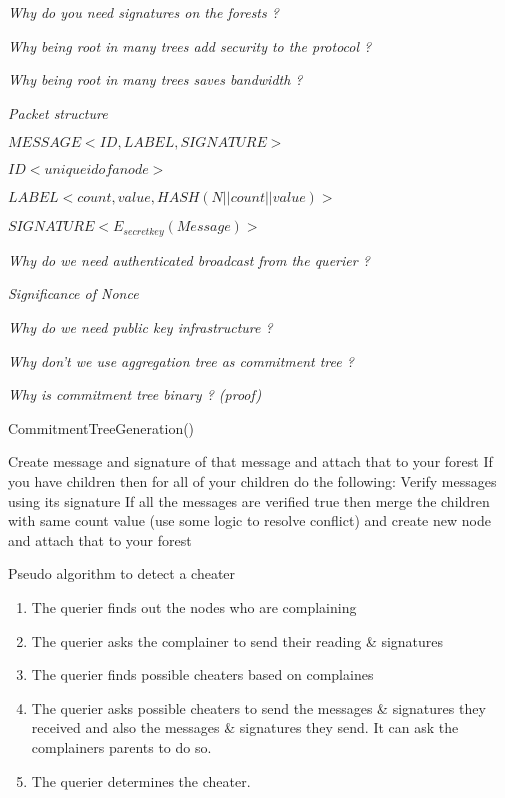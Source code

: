 \textit{Why do you need signatures on the forests ?}

\textit{Why being root in many trees add security to the protocol ?}

\textit{Why being root in many trees saves bandwidth ?}

\textit{Packet structure}

	$MESSAGE <ID, LABEL, SIGNATURE>$

	$ID <unique id of a node>$

	$LABEL <count, value, HASH(N||count||value)>$

	$SIGNATURE <E_{secretkey}(Message)>$

\textit{Why do we need authenticated broadcast from the querier ?}

\textit{Significance of Nonce}

\textit{Why do we need public key infrastructure ?}

\textit{Why don't we use aggregation tree as commitment tree ?}

\textit{Why is commitment tree binary ? (proof)}

\begin{algorithm}[H]
\caption {CommitmentTreeGeneration()}\label{number3}
	\begin {algorithmic}[1]
			\STATE Create message and signature of that message and attach that to your forest
			\STATE If you have children then for all of your children do the following:
			\STATE Verify messages using its signature 
			\STATE If all the messages are verified true then merge the children with same count value (use some logic to resolve conflict) and create new node and attach that to your forest
		\ENDFOR
	\end{algorithmic}
\end{algorithm}

\begin{algorithm}
\caption{Pseudo algorithm to detect a cheater}
	\begin{enumerate}
		\item The querier finds out the nodes who are complaining 
		\item The querier asks the complainer to send their reading \& signatures
		\item The querier finds possible cheaters based on complaines
		\item The querier asks possible cheaters to send the messages \& signatures they received and also the messages \& signatures they send. It can ask the complainers parents to do so.
		\item The querier determines the cheater. 
	\end{enumerate}

\end{algorithm}
